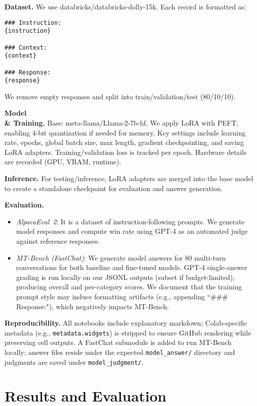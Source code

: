 \documentclass{assignment7_report}
\begin{document}
\textbf{Dataset.} We use databricks/databricks-dolly-15k. Each record is formatted as:
\begin{verbatim}
### Instruction:
{instruction}

### Context:
{context}

### Response:
{response}
\end{verbatim}
We remove empty responses and split into train/validation/test (80/10/10).

\textbf{Model \\& Training.} Base: meta-llama/Llama-2-7b-hf. We apply LoRA with PEFT, enabling 4-bit quantization if needed for memory. Key settings include learning rate, epochs, global batch size, max length, gradient checkpointing, and saving LoRA adapters. Training/validation loss is tracked per epoch. Hardware details are recorded (GPU, VRAM, runtime).

\textbf{Inference.} For testing/inference, LoRA adapters are merged into the base model to create a standalone checkpoint for evaluation and answer generation.

\textbf{Evaluation.} 
\begin{itemize}
  \item \emph{AlpacaEval~2}: It is a dataset of instruction-following prompts. We generate model responses and compute win rate using GPT-4 as an automated judge against reference responses.
  \item \emph{MT-Bench (FastChat)}: We generate model answers for 80 multi-turn conversations for both baseline and fine-tuned models. GPT-4 single-answer grading is run locally on our JSONL outputs (subset if budget-limited), producing overall and per-category scores. We document that the training prompt style may induce formatting artifacts (e.g., appending ``### Response:"), which negatively impacts MT-Bench.
\end{itemize}

\textbf{Reproducibility.} All notebooks include explanatory markdown; Colab-specific metadata (e.g., \texttt{metadata.widgets}) is stripped to ensure GitHub rendering while preserving cell outputs. A FastChat submodule is added to run MT-Bench locally; answer files reside under the expected \texttt{model\_answer/} directory and judgments are saved under \texttt{model\_judgment/}.


\section{Results and Evaluation}
\vspace*{-3mm}
\end{document}
